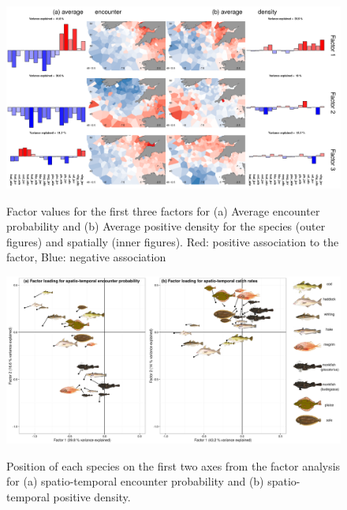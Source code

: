 \documentclass{nature}
\begin{document}


\begin{figure}
\begin{center}
	\includegraphics[width=\linewidth]{"figures/Fig1_Combined"}
	\label{fig:1}
	\caption{Factor values for the first three factors for (a) Average
		encounter probability and (b) Average positive density for the
		species (outer figures) and spatially (inner figures).
		Red: positive association to the factor, Blue: negative
		association}
\end{center}
\end{figure}


\begin{figure}
\begin{center}
	\includegraphics[width=\linewidth]{"figures/Figure 3 - PCAstyle_Plots_SpatioTemp"}
	\label{fig:2}
	\caption{Position of each species on the first two axes from the
		factor analysis for (a) spatio-temporal encounter probability
		and (b) spatio-temporal positive density.}
\end{center}
\end{figure}
\end{document}
